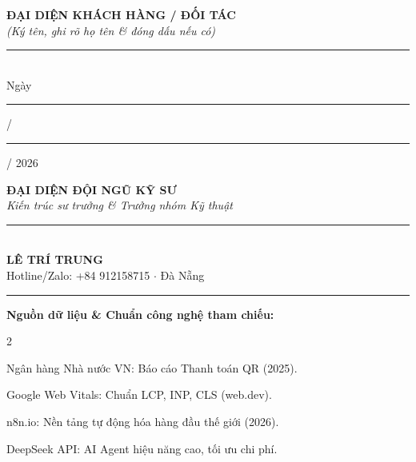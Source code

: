 \documentclass[11pt,a4paper]{article}
\begin{document}
\vspace{6mm}

\noindent
\begin{minipage}[t]{0.45\textwidth}
    \centering
    \textbf{\large ĐẠI DIỆN KHÁCH HÀNG / ĐỐI TÁC}\\[1mm]
    \textit{(Ký tên, ghi rõ họ tên \& đóng dấu nếu có)}\\[24mm]
    \rule{5.5cm}{0.4pt}\\[2mm]
    \small Ngày \rule{1cm}{0.4pt} / \rule{0.5cm}{0.4pt} / 2026
\end{minipage}
\hfill
\begin{minipage}[t]{0.45\textwidth}
    \centering
    \textbf{\large ĐẠI DIỆN ĐỘI NGŨ KỸ SƯ}\\
    \textit{Kiến trúc sư trưởng \& Trưởng nhóm Kỹ thuật}\\[20mm]
    \rule{5.5cm}{0.4pt}\\[2mm]
    \textbf{\large LÊ TRÍ TRUNG}\\
    \small Hotline/Zalo: +84 912158715 $\cdot$ Đà Nẵng
\end{minipage}

\vspace{5mm}
\noindent\rule{\textwidth}{0.3pt}
\begin{center}
\footnotesize\textcolor{mutedtext}{\textbf{Nguồn dữ liệu \& Chuẩn công nghệ tham chiếu:}}
\end{center}
\begin{multicols}{2}
\footnotesize\textcolor{mutedtext}{
\begin{enumerate}[leftmargin=*,itemsep=0.5pt,label={[\arabic*]}]
    \item Ngân hàng Nhà nước VN: Báo cáo Thanh toán QR (2025).
    \item Google Web Vitals: Chuẩn LCP, INP, CLS (web.dev).
    \item n8n.io: Nền tảng tự động hóa hàng đầu thế giới (2026).
    \item DeepSeek API: AI Agent hiệu năng cao, tối ưu chi phí.
\end{enumerate}
}
\end{multicols}
\end{document}
